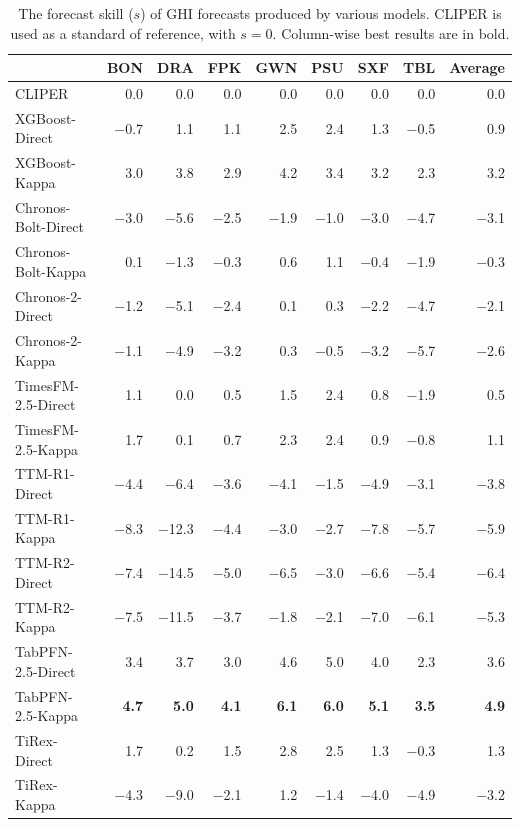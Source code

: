 \documentclass[number, 3p, 10pt, times]{elsarticle}
\begin{document}
\begin{table}[!ht]
\centering
\caption{The forecast skill ($s$) of GHI forecasts produced by various models. CLIPER is used as a standard of reference, with $s=0$. Column-wise best results are in bold.}
\label{tb:skillGh}
\footnotesize
\begin{tabular}{lrrrrrrrr}
\toprule
 & BON & DRA & FPK & GWN & PSU & SXF & TBL & Average \\
\midrule
CLIPER & 0.0 & 0.0 & 0.0 & 0.0 & 0.0 & 0.0 & 0.0 & 0.0 \\
XGBoost-Direct & $-$0.7 & 1.1 & 1.1 & 2.5 & 2.4 & 1.3 & $-$0.5 & 0.9 \\
XGBoost-Kappa & 3.0 & 3.8 & 2.9 & 4.2 & 3.4 & 3.2 & 2.3 & 3.2 \\
Chronos-Bolt-Direct & $-$3.0 & $-$5.6 & $-$2.5 & $-$1.9 & $-$1.0 & $-$3.0 & $-$4.7 & $-$3.1 \\
Chronos-Bolt-Kappa & 0.1 & $-$1.3 & $-$0.3 & 0.6 & 1.1 & $-$0.4 & $-$1.9 & $-$0.3 \\
Chronos-2-Direct & $-$1.2 & $-$5.1 & $-$2.4 & 0.1 & 0.3 & $-$2.2 & $-$4.7 & $-$2.1 \\
Chronos-2-Kappa & $-$1.1 & $-$4.9 & $-$3.2 & 0.3 & $-$0.5 & $-$3.2 & $-$5.7 & $-$2.6 \\
TimesFM-2.5-Direct & 1.1 & 0.0 & 0.5 & 1.5 & 2.4 & 0.8 & $-$1.9 & 0.5 \\
TimesFM-2.5-Kappa & 1.7 & 0.1 & 0.7 & 2.3 & 2.4 & 0.9 & $-$0.8 & 1.1 \\
TTM-R1-Direct & $-$4.4 & $-$6.4 & $-$3.6 & $-$4.1 & $-$1.5 & $-$4.9 & $-$3.1 & $-$3.8 \\
TTM-R1-Kappa & $-$8.3 & $-$12.3 & $-$4.4 & $-$3.0 & $-$2.7 & $-$7.8 & $-$5.7 & $-$5.9 \\
TTM-R2-Direct & $-$7.4 & $-$14.5 & $-$5.0 & $-$6.5 & $-$3.0 & $-$6.6 & $-$5.4 & $-$6.4 \\
TTM-R2-Kappa & $-$7.5 & $-$11.5 & $-$3.7 & $-$1.8 & $-$2.1 & $-$7.0 & $-$6.1 & $-$5.3 \\
TabPFN-2.5-Direct & 3.4 & 3.7 & 3.0 & 4.6 & 5.0 & 4.0 & 2.3 & 3.6 \\
TabPFN-2.5-Kappa & \textbf{4.7} & \textbf{5.0} & \textbf{4.1} & \textbf{6.1} & \textbf{6.0} & \textbf{5.1} & \textbf{3.5} & \textbf{4.9} \\
TiRex-Direct & 1.7 & 0.2 & 1.5 & 2.8 & 2.5 & 1.3 & $-$0.3 & 1.3 \\
TiRex-Kappa & $-$4.3 & $-$9.0 & $-$2.1 & 1.2 & $-$1.4 & $-$4.0 & $-$4.9 & $-$3.2 \\\bottomrule
\end{tabular}
\end{table}
\end{document}

